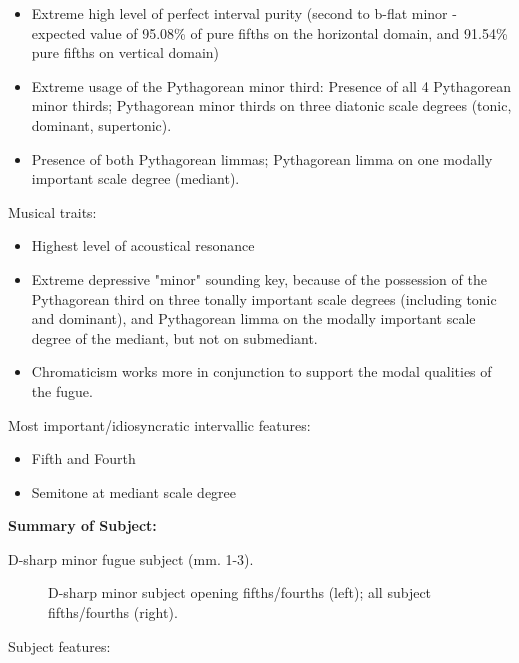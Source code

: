 \begin{itemize}
\tightlist
\item
  Extreme high level of perfect interval purity (second to b-flat minor
  - expected value of 95.08\% of pure fifths on the horizontal domain,
  and 91.54\% pure fifths on vertical domain)
\item
  Extreme usage of the Pythagorean minor third: Presence of all 4
  Pythagorean minor thirds; Pythagorean minor thirds on three diatonic
  scale degrees (tonic, dominant, supertonic).
\item
  Presence of both Pythagorean limmas; Pythagorean limma on one modally
  important scale degree (mediant).
\end{itemize}

Musical traits:

\begin{itemize}
\tightlist
\item
  Highest level of acoustical resonance
\item
  Extreme depressive "minor" sounding key, because of the possession of
  the Pythagorean third on three tonally important scale degrees
  (including tonic and dominant), and Pythagorean limma on the modally
  important scale degree of the mediant, but not on submediant.
\item
  Chromaticism works more in conjunction to support the modal qualities
  of the fugue.
\end{itemize}

Most important/idiosyncratic intervallic features:

\begin{itemize}
\tightlist
\item
  Fifth and Fourth
\item
  Semitone at mediant scale degree
\end{itemize}

\textbf{Summary of Subject:}



\begin{Example}[H]
\vspace{1.5em}
    \centering
    \caption{ D-sharp minor fugue subject (mm. 1-3). }
\end{Example}    


\begin{figure}[H]
\vspace{1.5em}
    \centering
    \caption[D-sharp minor subject opening fifths/fourths; all subject fifths/fourths. ]{D-sharp minor subject opening fifths/fourths (left); all subject fifths/fourths (right).}
\end{figure}    Subject features:

